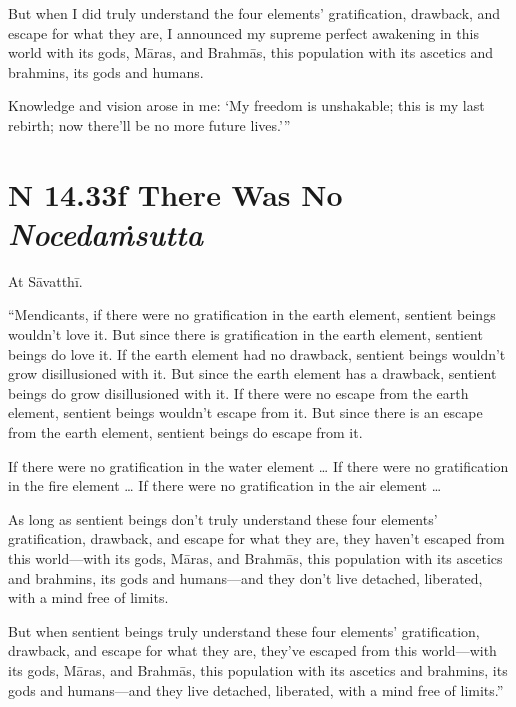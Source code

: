 \documentclass[12pt,openany]{book}%
\newcommand*{\suttatitleacronym}[1]{\smaller[2]{#1}\vspace*{.3em}}
\newcommand*{\suttatitletranslation}[1]{\linebreak{#1}}
\newcommand*{\suttatitleroot}[1]{\linebreak\smaller[2]\itshape{#1}}
\newcommand*{\tocacronym}[1]{\hspace*{-3.3em}{#1}\quad}
\newcommand*{\toctranslation}[1]{#1}
\newcommand*{\tocroot}[1]{(\textit{#1})}
\begin{document}
But when I did truly understand the four elements’ gratification, drawback, and escape for what they are, I announced my supreme perfect awakening in this world with its gods, \textsanskrit{Māras}, and \textsanskrit{Brahmās}, this population with its ascetics and brahmins, its gods and humans. 

Knowledge and vision arose in me: ‘My freedom is unshakable; this is my last rebirth; now there’ll be no more future lives.’” 

%
\section*{{\suttatitleacronym SN 14.33}{\suttatitletranslation If There Was No }{\suttatitleroot Nocedaṁsutta}}
\addcontentsline{toc}{section}{\tocacronym{SN 14.33} \toctranslation{If There Was No } \tocroot{Nocedaṁsutta}}

At \textsanskrit{Sāvatthī}. 

“Mendicants, if there were no gratification in the earth element, sentient beings wouldn’t love it. But since there is gratification in the earth element, sentient beings do love it. If the earth element had no drawback, sentient beings wouldn’t grow disillusioned with it. But since the earth element has a drawback, sentient beings do grow disillusioned with it. If there were no escape from the earth element, sentient beings wouldn’t escape from it. But since there is an escape from the earth element, sentient beings do escape from it. 

If there were no gratification in the water element … If there were no gratification in the fire element … If there were no gratification in the air element … 

As long as sentient beings don’t truly understand these four elements’ gratification, drawback, and escape for what they are, they haven’t escaped from this world—with its gods, \textsanskrit{Māras}, and \textsanskrit{Brahmās}, this population with its ascetics and brahmins, its gods and humans—and they don’t live detached, liberated, with a mind free of limits. 

But when sentient beings truly understand these four elements’ gratification, drawback, and escape for what they are, they’ve escaped from this world—with its gods, \textsanskrit{Māras}, and \textsanskrit{Brahmās}, this population with its ascetics and brahmins, its gods and humans—and they live detached, liberated, with a mind free of limits.” 
\end{document}
